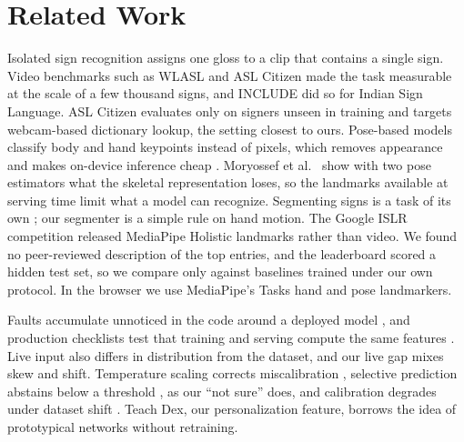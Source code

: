 \section{Related Work}
\label{sec:related}

Isolated sign recognition assigns one gloss to a clip that contains a single sign. Video
benchmarks such as WLASL \cite{li2020wlasl} and ASL Citizen \cite{desai2023aslcitizen} made the
task measurable at the scale of a few thousand signs, and INCLUDE \cite{sridhar2020include} did so
for Indian Sign Language. ASL Citizen evaluates only on signers unseen in training and targets
webcam-based dictionary lookup, the setting closest to ours. Pose-based models classify body and
hand keypoints instead of pixels, which removes appearance and makes on-device inference cheap
\cite{bohacek2022spoter,selvaraj2022openhands}. Moryossef et al.~\cite{moryossef2021pose} show
with two pose estimators what the skeletal representation loses, so the landmarks available at
serving time limit what a model can recognize. Segmenting signs is a task of its own
\cite{renz2021segmentation}; our segmenter is a simple rule on hand motion. The Google ISLR
competition \cite{kaggle2023islr} released MediaPipe Holistic landmarks rather than video. We
found no peer-reviewed description of the top entries, and the leaderboard scored a hidden test
set, so we compare only against baselines trained under our own protocol. In the browser we use
MediaPipe's Tasks hand \cite{zhang2020mediapipehands} and pose \cite{bazarevsky2020blazepose}
landmarkers.

Faults accumulate unnoticed in the code around a deployed model \cite{sculley2015debt}, and
production checklists test that training and serving compute the same features
\cite{breck2017mltestscore}. Live input also differs in distribution from the dataset, and our
live gap mixes skew and shift. Temperature scaling corrects miscalibration
\cite{guo2017calibration}, selective prediction abstains below a threshold
\cite{geifman2017selective}, as our ``not sure'' does, and calibration degrades under dataset
shift \cite{ovadia2019shift}. Teach Dex, our personalization feature, borrows the idea of
prototypical networks \cite{snell2017prototypical} without retraining.
